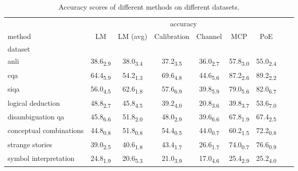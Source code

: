 \begin{table}[h]
\centering
\caption{Accuracy scores of different methods on different datasets.}
\label{tab:main_exp}
\begin{tabular}{l|c|c|c|c|c|c|c|c}
 & \multicolumn{6}{c}{accuracy} \\
method & LM & LM (avg) & Calibration & Channel & MCP & PoE \\
dataset &  &  &  &  &  &  \\
anli & 38.6\textsubscript{2.9} & 38.0\textsubscript{3.4} & 37.2\textsubscript{3.5} & 36.0\textsubscript{2.7} & 57.8\textsubscript{3.0} & 55.0\textsubscript{2.4} \\
cqa & 64.4\textsubscript{5.9} & 54.2\textsubscript{1.3} & 69.6\textsubscript{4.8} & 44.6\textsubscript{5.6} & 87.2\textsubscript{2.6} & 89.2\textsubscript{2.2} \\
siqa & 56.0\textsubscript{4.5} & 62.6\textsubscript{1.8} & 57.6\textsubscript{6.9} & 39.8\textsubscript{5.9} & 79.0\textsubscript{5.6} & 82.0\textsubscript{6.7} \\
logical deduction & 48.8\textsubscript{2.7} & 45.8\textsubscript{4.5} & 39.2\textsubscript{4.0} & 20.8\textsubscript{3.6} & 39.8\textsubscript{3.7} & 53.6\textsubscript{7.0} \\
disambiguation qa & 45.8\textsubscript{6.6} & 51.8\textsubscript{2.0} & 48.0\textsubscript{2.9} & 39.6\textsubscript{6.6} & 67.8\textsubscript{1.9} & 67.4\textsubscript{2.5} \\
conceptual combinations & 44.8\textsubscript{0.8} & 51.8\textsubscript{0.8} & 54.4\textsubscript{0.5} & 44.0\textsubscript{0.7} & 60.2\textsubscript{1.5} & 72.2\textsubscript{0.8} \\
strange stories & 39.0\textsubscript{2.5} & 40.6\textsubscript{1.8} & 43.4\textsubscript{1.7} & 26.6\textsubscript{1.7} & 74.0\textsubscript{0.7} & 76.6\textsubscript{0.9} \\
symbol interpretation & 24.8\textsubscript{1.9} & 20.6\textsubscript{5.3} & 21.0\textsubscript{3.9} & 17.0\textsubscript{4.6} & 25.4\textsubscript{2.9} & 25.2\textsubscript{4.0} \\
\end{tabular}
\end{table}
